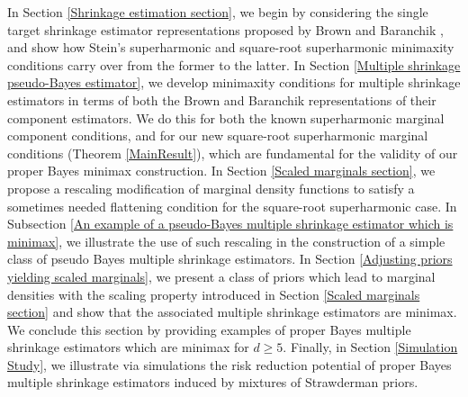\documentclass[11pt]{article}
\theoremstyle{definition}
\begin{document}
In Section \ref{Shrinkage estimation section}, we begin by considering the single target shrinkage estimator representations proposed by Brown \cite{Brown1971} and Baranchik \cite{Baranchik1970}, and show how Stein's superharmonic and square-root superharmonic minimaxity conditions carry over from the former to the latter.  In Section \ref{Multiple shrinkage pseudo-Bayes estimator}, we develop minimaxity conditions for  multiple shrinkage estimators in terms of both the Brown and Baranchik representations of their component estimators.  We do this for both the known superharmonic marginal component conditions, and for our new square-root superharmonic marginal conditions (Theorem \ref{MainResult}), which are fundamental for the validity of our proper Bayes minimax construction.  In Section \ref{Scaled marginals section}, we propose a rescaling modification of marginal density functions to satisfy a sometimes needed flattening condition for the square-root superharmonic case. In Subsection \ref{An example of a pseudo-Bayes multiple shrinkage estimator which is minimax}, we illustrate the use of such rescaling in the construction of a simple class of pseudo Bayes multiple shrinkage estimators.  In Section \ref{Adjusting priors yielding scaled marginals}, we present a class of priors which lead to marginal densities with the scaling property introduced in Section \ref{Scaled marginals section} and show that the associated multiple shrinkage estimators are minimax. We conclude this section by providing examples of proper Bayes multiple shrinkage estimators which are minimax for $d \geq 5$. Finally, in Section \ref{Simulation Study}, we illustrate via simulations the risk reduction potential of proper Bayes multiple shrinkage estimators induced by mixtures of Strawderman priors.
\end{document}
